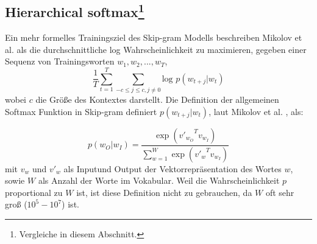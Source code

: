 \documentclass[12pt,a4paper]{report}
\begin{document}
\subsection*{Hierarchical softmax\footnote{Vergleiche \cite{DBLP:journals/corr/MikolovSCCD13} in diesem Abschnitt.}}
Ein mehr formelles Trainingsziel des Skip-gram Modells beschreiben Mikolov et al.\cite{DBLP:journals/corr/MikolovSCCD13} als die durchschnittliche log Wahrscheinlichkeit zu maximieren, gegeben einer Sequenz von Trainingsworten $w_1, w_2,...,w_T$,\\
 \begin{equation}
\frac{1}{T} \sum_{t=1}^T \sum_{-c \le j \le c, j \neq 0} \textrm{log } p(w_{t+j}|w_t) 
  \end{equation}
  wobei $c$ die Größe des Kontextes darstellt\citep{DBLP:journals/corr/MikolovSCCD13}. Die Definition der allgemeinen Softmax Funktion in Skip-gram definiert $p(w_{t+j}|w_t)$, laut Mikolov et al. \cite{DBLP:journals/corr/MikolovSCCD13}, als:
  
 \begin{equation}
p(w_O|w_I)=\frac{\exp({v'_{w_O}}^T v_{w_I}) }{\sum_{w=1}^W \exp({v'_w}^{T} v_{w_I})} 
  \end{equation}
  mit $v_w$ und $v'_w$ als \glqq Input\grqq und \glqq Output\grqq{} der Vektorrepräsentation des Wortes $w$, sowie $W$ als Anzahl der Worte im Vokabular. Weil die Wahrscheinlichkeit $p$ proportional zu $W$ ist, ist diese Definition nicht zu gebrauchen, da $W$ oft sehr groß ($10^5 - 10^7$) ist\cite{DBLP:journals/corr/MikolovSCCD13}.\\
  
\end{document}
